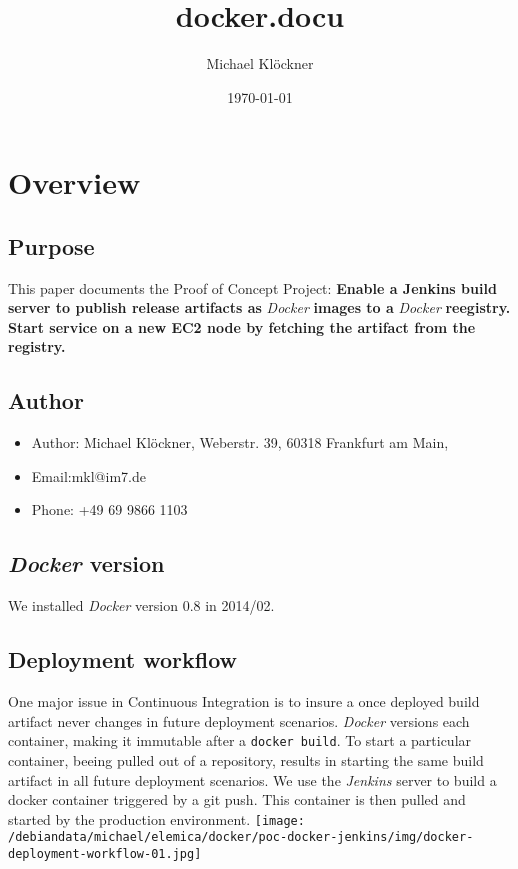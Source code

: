 \documentclass[11pt]{article}
\title{docker.docu}
\author{Michael Klöckner}
\date{\today}
\begin{document}
\maketitle

\setcounter{tocdepth}{3}
\tableofcontents
\vspace*{1cm}


\section{Overview}
\label{sec-1}
\subsection{Purpose}
\label{sec-1-1}

This paper documents the Proof of Concept Project:
\textbf{Enable a Jenkins build server to publish release artifacts as} \emph{Docker} \textbf{images to a} \emph{Docker} \textbf{reegistry. Start service on a new EC2 node by fetching the artifact from the registry.}
\subsection{Author}
\label{sec-1-2}

\begin{itemize}
\item Author: Michael Klöckner, Weberstr. 39, 60318 Frankfurt am Main,
\item Email:mkl@im7.de
\item Phone: +49 69 9866 1103
\end{itemize}
\subsection{\emph{Docker} version}
\label{sec-1-3}

   We installed \emph{Docker} version 0.8 in 2014/02.
\subsection{Deployment workflow}
\label{sec-1-4}

One major issue in Continuous Integration is to insure a once deployed build artifact never changes in future deployment scenarios. \emph{Docker} versions each container, making it immutable after a \texttt{docker build}. To start a particular container, beeing pulled out of a repository, results in starting the same build artifact in all future deployment scenarios. We use the \emph{Jenkins} server to build a docker container triggered by a git push. This container is then pulled and started by the production environment.
 \texttt{[image: /debiandata/michael/elemica/docker/poc-docker-jenkins/img/docker-deployment-workflow-01.jpg]}
\end{document}
